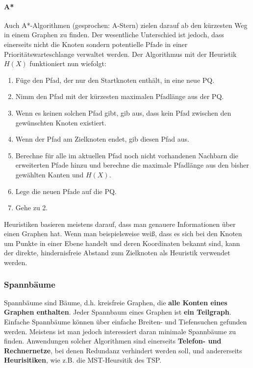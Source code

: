 \documentclass{article}
\begin{document}
\paragraph{A*}
Auch A*-Algorithmen (gesprochen: A-Stern) zielen darauf ab den kürzesten Weg in einem Graphen zu finden. Der wesentliche Unterschied ist jedoch, dass einerseits nicht die Knoten sondern potentielle Pfade in einer Prioritätswarteschlange verwaltet werden.
Der Algorithmus mit der Heuristik $H(X)$ funktioniert nun wiefolgt:
\begin{enumerate}
    \item Füge den Pfad, der nur den Startknoten enthält, in eine neue PQ.
    \item Nimm den Pfad mit der kürzesten maximalen Pfadlänge aus der PQ.
    \item Wenn es keinen solchen Pfad gibt, gib aus, dass kein Pfad zwischen den gewünschten Knoten existiert.
    \item Wenn der Pfad am Zielknoten endet, gib diesen Pfad aus.
    \item Berechne für alle im aktuellen Pfad noch nicht vorhandenen Nachbarn die erweiterten Pfade hinzu und berechne die maximale Pfadlänge aus den bisher gewählten Kanten und $H(X)$.
    \item Lege die neuen Pfade auf die PQ.
    \item Gehe zu 2.
\end{enumerate}
Heuristiken basieren meistens darauf, dass man genauere Informationen über einen Graphen hat. Wenn man beispielsweise weiß, dass es sich bei den Knoten um Punkte in einer Ebene handelt und deren Koordinaten bekannt sind, kann der direkte, hindernisfreie Abstand zum Zielknoten als Heuristik verwendet werden.
\subsubsection{Spannbäume}
Spannbäume sind Bäume, d.h. kreisfreie Graphen, die \textbf{alle Konten eines Graphen enthalten}. Jeder Spannbaum eines Graphen ist \textbf{ein Teilgraph}.\\
Einfache Spannbäume können über einfache Breiten- und Tiefensuchen gefunden werden. Meistens ist man jedoch interessiert daran minimale Spannbäume zu finden. Anwendungen solcher Algorithmen sind einerseits \textbf{Telefon- und Rechnernetze}, bei denen Redundanz verhindert werden soll, und andererseits \textbf{Heurisitiken}, wie z.B. die MST-Heursitik des TSP.
\end{document}
